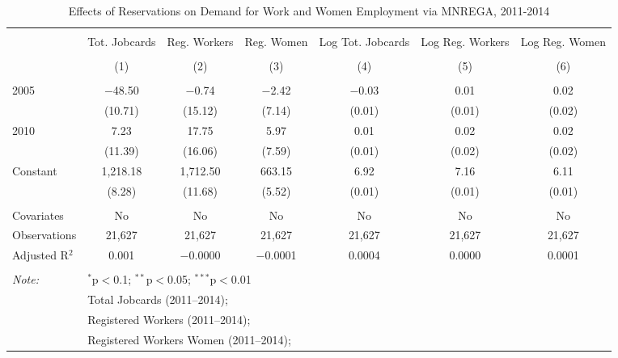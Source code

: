 
\begin{table}[!htbp] \centering 
  \caption{Effects of Reservations on Demand for Work and Women Employment via MNREGA, 2011-2014} 
  \label{mnrega_main_up} 
\scriptsize 
\begin{tabular}{@{\extracolsep{1pt}}lcccccc} 
\\[-1.8ex]\hline 
\hline \\[-1.8ex] 
 & Tot. Jobcards & Reg. Workers & Reg. Women & Log Tot. Jobcards & Log Reg. Workers & Log Reg. Women \\ 
\\[-1.8ex] & (1) & (2) & (3) & (4) & (5) & (6)\\ 
\hline \\[-1.8ex] 
 2005 & $-$48.50 & $-$0.74 & $-$2.42 & $-$0.03 & 0.01 & 0.02 \\ 
  & (10.71) & (15.12) & (7.14) & (0.01) & (0.01) & (0.02) \\ 
  2010 & 7.23 & 17.75 & 5.97 & 0.01 & 0.02 & 0.02 \\ 
  & (11.39) & (16.06) & (7.59) & (0.01) & (0.02) & (0.02) \\ 
  Constant & 1,218.18 & 1,712.50 & 663.15 & 6.92 & 7.16 & 6.11 \\ 
  & (8.28) & (11.68) & (5.52) & (0.01) & (0.01) & (0.01) \\ 
 \hline \\[-1.8ex] 
Covariates & No & No & No & No & No & No \\ 
Observations & 21,627 & 21,627 & 21,627 & 21,627 & 21,627 & 21,627 \\ 
Adjusted R$^{2}$ & 0.001 & $-$0.0000 & $-$0.0001 & 0.0004 & 0.0000 & 0.0001 \\ 
\hline 
\hline \\[-1.8ex] 
\textit{Note:}  & \multicolumn{6}{l}{$^{*}$p$<$0.1; $^{**}$p$<$0.05; $^{***}$p$<$0.01} \\ 
 & \multicolumn{6}{l}{Total Jobcards (2011--2014);} \\ 
 & \multicolumn{6}{l}{Registered Workers (2011--2014);} \\ 
 & \multicolumn{6}{l}{Registered Workers Women  (2011--2014);} \\ 
\end{tabular} 
\end{table} 

